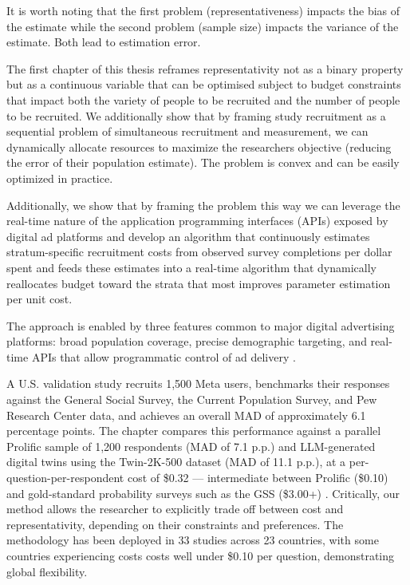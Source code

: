 It is worth noting that the first problem (representativeness) impacts the bias of the estimate while the second problem (sample size) impacts the variance of the estimate. Both lead to estimation error.

The first chapter of this thesis reframes representativity not as a binary property but as a continuous variable that can be optimised subject to budget constraints that impact both the variety of people to be recruited and the number of people to be recruited. We additionally show that by framing study recruitment as a sequential problem of simultaneous recruitment and measurement, we can dynamically allocate resources to maximize the researchers objective (reducing the error of their population estimate). The problem is convex and can be easily optimized in practice. 

Additionally, we show that by framing the problem this way we can leverage the real-time nature of the application programming interfaces (APIs) exposed by digital ad platforms and develop an algorithm that continuously estimates stratum-specific recruitment costs from observed survey completions per dollar spent and feeds these estimates into a real-time algorithm that dynamically reallocates budget toward the strata that most improves parameter estimation per unit cost. 

The approach is enabled by three features common to major digital advertising platforms: broad population coverage, precise demographic targeting, and real-time APIs that allow programmatic control of ad delivery \citep{zhang2020quota,aridor2024experiments}. 

A U.S. validation study recruits 1,500 Meta users, benchmarks their responses against the General Social Survey, the Current Population Survey, and Pew Research Center data, and achieves an overall MAD of approximately 6.1 percentage points. The chapter compares this performance against a parallel Prolific sample of 1,200 respondents (MAD of 7.1 p.p.) and LLM-generated digital twins using the Twin-2K-500 dataset \citep{toubia2025twin} (MAD of 11.1 p.p.), at a per-question-per-respondent cost of \$0.32 --- intermediate between Prolific (\$0.10) and gold-standard probability surveys such as the GSS (\$3.00+) \citep{goel2015non}. Critically, our method allows the researcher to explicitly trade off between cost and representativity, depending on their constraints and preferences. The methodology has been deployed in 33 studies across 23 countries, with some countries experiencing costs costs well under \$0.10 per question, demonstrating global flexibility.

